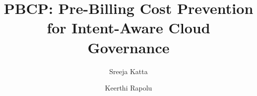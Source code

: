 \documentclass[sigconf,nonacm]{acmart}
\begin{document}
\title{PBCP: Pre-Billing Cost Prevention for Intent-Aware Cloud Governance}

\author{Sreeja Katta}
\author{Keerthi Rapolu}

\begin{abstract}

\end{abstract}

\maketitle












\end{document}
